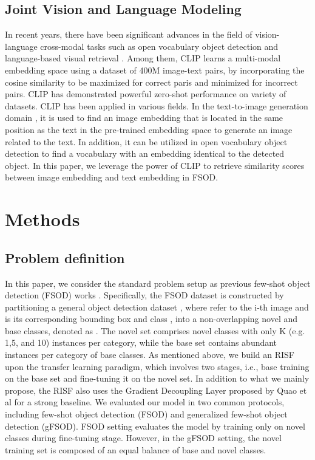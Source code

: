 \documentclass{article}
\begin{document}
\subsection{Joint Vision and Language Modeling}
In recent years, there have been significant advances in the field of vision-language cross-modal tasks such as open vocabulary object detection \cite{openvocab, vild, regionclip} and language-based visual retrieval \cite{videoclip,imageret}. 
Among them, CLIP \cite{clip} learns a multi-modal embedding space using a dataset of 400M image-text pairs, by incorporating the cosine similarity to be maximized for correct paris and minimized for incorrect pairs.
CLIP has demonstrated powerful zero-shot performance on variety of datasets.
CLIP has been applied in various fields. In the text-to-image generation domain \cite{styleclip, dalle}, it is used to find an image embedding that is located in the same position as the text in the pre-trained embedding space to generate an image related to the text. In addition, it can be utilized in open vocabulary object detection \cite{regionclip} to find a vocabulary with an embedding identical to the detected object.
In this paper, we leverage the power of CLIP to retrieve similarity scores between image embedding and text embedding in FSOD.

\section{Methods}

\subsection{Problem definition}
In this paper, we consider the standard problem setup as previous few-shot object detection (FSOD) works \cite{tfa, defrcn, dcf}.
Specifically, the FSOD dataset is constructed by partitioning a general object detection dataset , where  refer to the i-th image and  is its corresponding bounding box and class , into a non-overlapping novel and base classes, denoted as .
The novel set comprises novel classes with only K (e.g. 1,5, and 10) instances per category, while the base set contains abundant instances per category of base classes.
As mentioned above, we build an RISF upon the transfer learning paradigm, which involves two stages, i.e., base training on the base set and fine-tuning it on the novel set. 
In addition to what we mainly propose, the RISF also uses the Gradient Decoupling Layer proposed by Quao et al \cite{defrcn} for a strong baseline.
We evaluated our model in two common protocols, including few-shot object detection (FSOD) and generalized few-shot object detection (gFSOD). 
FSOD setting evaluates the model by training only on novel classes during fine-tuning stage.
However, in the gFSOD setting, the novel training set is composed of an equal balance of base and novel classes.
\end{document}
